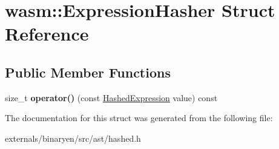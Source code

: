 \hypertarget{structwasm_1_1_expression_hasher}{}\section{wasm\+:\+:Expression\+Hasher Struct Reference}
\label{structwasm_1_1_expression_hasher}
\subsection*{Public Member Functions}
\begin{DoxyCompactItemize}
\item 
\mbox{\label{structwasm_1_1_expression_hasher_aed06a09ffc46a63f759baf5f177055da}} 
size\+\_\+t {\bfseries operator()} (const \mbox{\hyperlink{structwasm_1_1_hashed_expression}{Hashed\+Expression}} value) const
\end{DoxyCompactItemize}


The documentation for this struct was generated from the following file\+:\begin{DoxyCompactItemize}
\item 
externals/binaryen/src/ast/hashed.\+h\end{DoxyCompactItemize}
